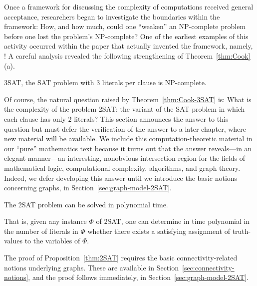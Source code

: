 {Once a framework for discussing the complexity of computations received general acceptance, researchers began to investigate the boundaries within the framework: How, and how much, could one ``weaken'' an {\sf NP}-complete problem before one lost the problem's {\sf NP}-complete?  One of the earliest examples of this activity occurred within the paper that actually invented the framework, namely, \cite{Cook71}!  A careful analysis revealed the following strengthening of Theorem~\ref{thm:Cook}(a).

\begin{theorem}
\label{thm:Cook-3SAT}
{\sf 3SAT}, the {\sf SAT} problem with $3$ literals per clause is {\sf NP}-complete.
\end{theorem}


Of course, the natural question raised by Theorem~\ref{thm:Cook-3SAT} is: What is the complexity of the problem {\sf 2SAT}: the variant  of the {\sf SAT} problem in which each clause has only $2$ literals?  This section announces the answer to this question but must defer the verification of the answer to a later chapter, where new material will be available.  We include this computation-theoretic material in our ``pure'' mathematics text because it turns out that the answer reveals---in an elegant manner---an interesting, nonobvious intersection region for the fields of mathematical logic, computational complexity, algorithms, and graph theory.  Indeed, we defer developing this answer until we  introduce the basic notions concerning graphs, in
Section~\ref{sec:graph-model-2SAT}.

\begin{prop}
\label{thm:2SAT}
The {\sf 2SAT} problem can be solved in polynomial time.

\noindent
That is, given any instance $\Phi$ of {\sf 2SAT}, one can determine in time polynomial in the number of literals in $\Phi$ whether there exists a satisfying assignment of truth-values to the variables of $\Phi$.
\end{prop}

The proof of Proposition~\ref{thm:2SAT} requires the basic connectivity-related notions underlying graphs.  
These are available in Section~\ref{sec:connectivity-notions}, and the proof follows immediately, in Section~\ref{sec:graph-model-2SAT}.

}
